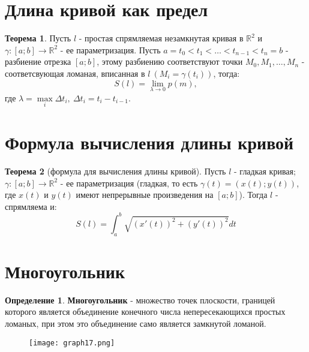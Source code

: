 \documentclass{report}
\theoremstyle{definition}
\newtheorem*{definition}{Определение}
\newtheorem*{theorem}{Теорема}
\begin{document}
\section{Длина кривой как предел}

\begin{theorem}
    Пусть $l$ - простая спрямляемая незамкнутая кривая в $\mathbb{R}^2$ и $\gamma:[a;b]\rightarrow\mathbb{R}^2$
    - ее параметризация. Пусть $a = t_0 < t_1 < \ldots < t_{n-1} < t_n = b$ - разбиение отрезка $[a;b]$,
    этому разбиению соответствуют точки $M_0,M_1,\ldots,M_n$ - соответсвующая ломаная, вписанная в $l \
        (M_i = \gamma(t_i))$, тогда:
    \begin{equation*}
        S(l) = \underset{\lambda\rightarrow0}{\lim}p(m),
    \end{equation*}
    где $\lambda = \underset{i}{\max}\Delta t_i, \ \Delta t_i = t_i - t_{i-1}$.
\end{theorem}

\section{Формула вычисления длины кривой}

\begin{theorem}[формула для вычисления длины кривой]
    Пусть $l$ - гладкая кривая; $\gamma:[a;b]\rightarrow\mathbb{R}^2$ - ее параметризация (гладкая,
    то есть $\gamma(t) = (x(t);y(t))$, где $x(t)$ и $y(t)$ имеют непрерывные произведения на $[a;b]$).
    Тогда $l$ - спрямляема и:
    \begin{equation*}
        S(l) = \int_{a}^{b}\sqrt{(x'(t))^2 + (y'(t))^2}dt
    \end{equation*}
\end{theorem}

\section{Многоугольник}

\begin{definition}
    \textbf{Многоугольник} - множество точек плоскости, границей которого является объединение конечного
    числа непересекающихся простых ломаных, при этом это объединение само является замкнутой ломаной.
    \begin{figure}[H]
        \begin{center}
            \texttt{[image: graph17.png]}\label{figure17}
        \end{center}
    \end{figure}
\end{definition}
\end{document}
